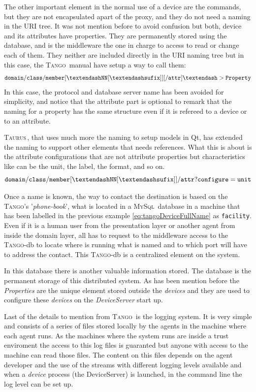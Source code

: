 \documentclass[10pt,a4paper,twoside]{llncs}
\newcommand{\tango}{\textsc{Tango}}
\newcommand{\taurus}{\textsc{Taurus}}
\newcommand{\mysql}{\textsc{MySql}}
\begin{document}
The other important element in the normal use of a device are the commands, but they are not encapsulated apart of the proxy, and they do not need a naming in the URI tree. It was not mention before to avoid confusion but both, device and its attributes have properties. They are permanently stored using the database, and is the middleware the one in charge to access to read or change each of them. They neither are included directly in the URI naming tree but in this case, the \tango\, manual \cite{tango81} have setup a way to call them:
\begin{equation}
    {\tt domain/class/member[\textendash NN[\textendash sufix]][/attr]\textendash >Property}\label{eq:tangoProperty}
\end{equation}
In this case, the protocol and database server name has been avoided for simplicity, and notice that the attribute part is optional to remark that the naming for a property has the same structure even if it is refereed to a device or to an attribute.

\taurus\,, that uses much more the naming to setup models in Qt, has extended the naming to support other elements that needs references. What this is about is the attribute configurations that are not attribute properties but characteristics like can be the unit, the label, the format, and so on.
\begin{equation}
    {\tt domain/class/member[\textendash NN[\textendash sufix]]/attr?configure=unit}\label{eq:taurusAttrConf}
\end{equation}

Once a name is known, the way to contact the destination is based on the \tango's '\emph{phone-book}', what is located in a \mysql\, database in a machine that has been labelled in the previous example \ref{eq:tangoDeviceFullName} as {\tt facility}. Even if it is a human user from the presentation layer or another agent from inside the domain layer, all has to request to the middleware access to the \tango-db to locate where is running what is named and to which port will have to address the contact. This \tango-db is a centralized element on the system.

In this database there is another valuable information stored. The database is the permanent storage of this distributed system. As has been mention before the \emph{Properties} are the unique element stored outside the \emph{devices} and they are used to configure these \emph{devices} on the \emph{DeviceServer} start up.

Last of the details to mention from \tango\, is the logging system. It is very simple and consists of a series of files stored locally by the agents in the machine where each agent runs. As the machines where the system runs are inside a trust enviroment the access to this log files is guaranted but anyone with access to the machine can read those files. The content on this files depends on the agent developer and the use of the streams with different logging levels available and when a \emph{device} process (the DeviceServer) is launched, in the command line the log level can be set up.
\end{document}
